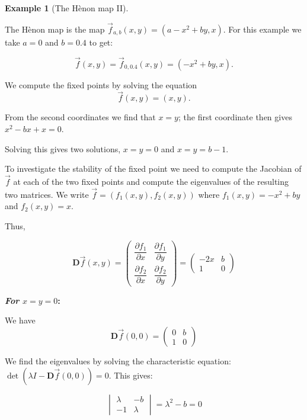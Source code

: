 \documentclass[
  a4paper,
  oneside,
  final]{krantz}
\newcommand{\pder}[2]{\dfrac{\partial #1}{\partial#2}}
\newcommand{\jacob}{{\mathbf{D}}\vec{f}}
\theoremstyle{definition}
\theoremstyle{definition}
\newtheorem{example}{Example}[chapter]
\theoremstyle{definition}
\theoremstyle{definition}
\theoremstyle{remark}
\begin{document}
\begin{example}[The Hènon map II]
\protect\hypertarget{exm:Henonmap2}{}\label{exm:Henonmap2}

The Hènon map is the map \(\vec{f}_{a,b}(x,y) = (a - x^2 + by, x)\). For this example we take \(a=0\) and \(b = 0.4\) to get:

\[\vec{f}(x,y) = \vec{f}_{0,0.4}(x,y)= (-x^2 + by, x).\]

We compute the fixed points by solving the equation \[ \vec{f}(x,y) = (x,y). \]

From the second coordinates we find that \(x= y\); the first coordinate then gives \(x^2 - bx + x = 0\).

Solving this gives two solutions, \(x = y = 0\) and \(x = y = b-1\).

To investigate the stability of the fixed point we need to compute the Jacobian of \(\vec{f}\) at each of the two fixed points and compute the eigenvalues of the resulting two matrices. We write \(\vec{f} = (f_1(x,y), f_2(x,y))\) where \(f_1(x,y) = -x^2 + by\) and \(f_2(x,y) = x\).

Thus,

\[
  \jacob{(x,y)} = \begin{pmatrix}
                            \pder{f_1}{x} & \pder{f_1}{y} \\ 
                            \pder{f_2}{x} & \pder{f_2}{y}
                         \end{pmatrix}  = \begin{pmatrix}
                            -2x & b \\ 
                            1 &  0
                         \end{pmatrix}
\]

\textbf{\emph{For \(x = y= 0\)}:}

We have
\[\jacob{(0,0)} = \begin{pmatrix}
                            0 & b \\ 
                            1 &  0
                         \end{pmatrix} \]

We find the eigenvalues by solving the characteristic equation: \(\det(\lambda I - \jacob{(0,0)}) = 0\). This gives:

\[ 
\begin{vmatrix}
  \lambda & -b \\ 
  -1 & \lambda
\end{vmatrix} = \lambda^2 - b = 0
\]


\end{example}
\end{document}
